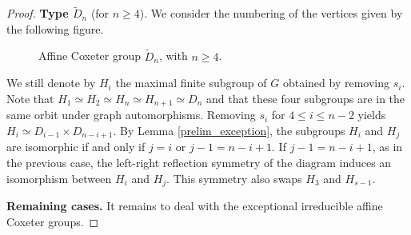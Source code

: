 \documentclass[a4paper, 11pt]{amsart}
\theoremstyle{definition}
\theoremstyle{remark}
\renewcommand{\leq}{\leqslant}
\renewcommand{\geq}{\geqslant}
\begin{document}
\begin{proof}
\smallskip

\textbf{Type $\tilde{D}_n$} (for $n\geq 4$). We consider the numbering of the vertices given by the following figure.

\begin{figure}[h!]
  \centering
  \caption{Affine Coxeter group $\tilde{D}_n$, with $n\geq 4$.}
  \label{Dlemme}
\end{figure}

We still denote by $H_i$ the maximal finite subgroup of $G$ obtained by removing $s_i$. Note that $H_1\simeq H_2\simeq H_n\simeq H_{n+1}\simeq D_n$ and that these four subgroups are in the same orbit under graph automorphisms. Removing $s_i$ for $4\leq i\leq n-2$ yields $H_i\simeq D_{i-1} \times D_{n-i+1}$. By Lemma \ref{prelim_exception}, the subgroups $H_i$ and $H_j$ are isomorphic if and only if $j = i$ or $j-1 = n-i+1$. If $j-1 = n-i+1$, as in the previous case, the left-right reflection symmetry of the diagram induces an isomorphism between $H_i$ and $H_j$. This symmetry also swaps $H_3$ and $H_{s-1}$.


\smallskip

\textbf{Remaining cases.} It remains to deal with the exceptional irreducible affine Coxeter groups.


\end{proof}
\end{document}

